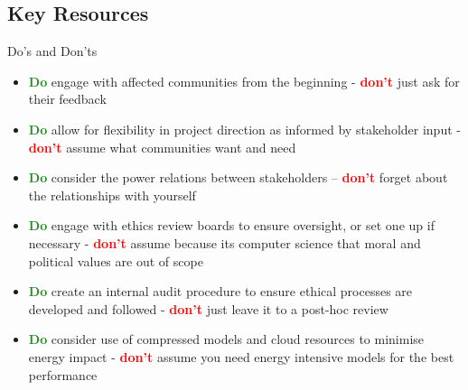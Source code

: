 \subsection{Key Resources}
Do's and Don'ts
\begin{itemize}
    \item \textcolor{ForestGreen}{\textbf{Do}} engage with affected communities from the beginning - \textcolor{red}{\textbf{don't}} just ask for their feedback
    \item \textcolor{ForestGreen}{\textbf{Do}} allow for flexibility in project direction as informed by stakeholder input - \textcolor{red}{\textbf{don't}} assume what communities want and need
    \item \textcolor{ForestGreen}{\textbf{Do}} consider the power relations between stakeholders -- \textcolor{red}{\textbf{don't}} forget about the relationships with yourself
    \item \textcolor{ForestGreen}{\textbf{Do}} engage with ethics review boards to ensure oversight, or set one up if necessary - \textcolor{red}{\textbf{don't}} assume because its computer science that moral and political values are out of scope
    \item \textcolor{ForestGreen}{\textbf{Do}} create an internal audit procedure to ensure ethical processes are developed and followed - \textcolor{red}{\textbf{don't}} just leave it to a post-hoc review 
    \item \textcolor{ForestGreen}{\textbf{Do}} consider use of compressed models and cloud resources to minimise energy impact - \textcolor{red}{\textbf{don't}} assume you need energy intensive models for the best performance
\end{itemize}

